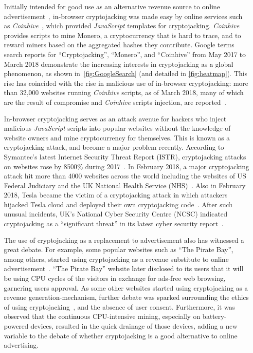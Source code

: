 \documentclass[acmlarge]{acmart}
\newcommand{\ch}{{\em Coinhive}\xspace}
\newcommand{\js}{{\em JavaScript}\xspace}
\newcommand{\cc}{{cryptocurrency}\xspace}
\newcommand{\cj}{cryptojacking\xspace}
\begin{document}
Initially intended for good use as an alternative revenue source to online advertisement~\cite{kerbs}, in-browser \cj was made easy by online services such as \ch~\cite{coinhive}, which provided \js templates for \cj. \ch provides scripts to mine Monero, a \cc that is hard to trace, and to reward miners based on the aggregated hashes they contribute.  Google terms search reports for ``Cryptojacking'', ``Monero'', and ``Coinhive'' from May 2017 to March 2018 demonstrate the increasing interests in \cj as a global phenomenon, as shown in~\autoref{fig:GoogleSearch} (and detailed in \autoref{fig:heatmap}). This rise has coincided with the rise in malicious use of in-browser \cj: more than 32,000 websites running \ch scripts, as of March 2018, many of which are the result of compromise and \ch scripts injection, are reported~\cite{kerbs}.






In-browser \cj serves as an attack avenue for hackers who inject malicious \js scripts into popular websites without the knowledge of website owners and mine \cc for themselves. This is known as a \cj attack, and become a major problem recently. According to Symantec's latest Internet Security Threat Report (ISTR), \cj attacks on websites rose by 8500\% during 2017~\cite{Mathur_18,Singh_18}. In February 2018, a major \cj attack hit more than 4000 websites across the world including the websites of US Federal Judiciary and the UK National Health Service (NHS)~\cite{condliffe_18}. Also in February 2018, Tesla became the victim of a \cj attack in which attackers hijacked Tesla cloud and deployed their own \cj code~\cite{Rayome_18}. After such unusual incidents, UK's National Cyber Security Centre (NCSC) indicated \cj as a ``significant threat'' in its latest cyber security report~\cite{de_18,ncsc_18}. 



The use of \cj as a replacement to advertisement also has witnessed a great debate. For example, some popular websites such as ``The Pirate Bay'', among others, started using \cj as a revenue substitute to online advertisement~\cite{Shaikh_17,Ernesto_17,Jones_2017}. ``The Pirate Bay'' website later disclosed to its users that it will be using CPU cycles of the visitors in exchange for ads-free web browsing, garnering users approval. As some other websites started using \cj as a revenue generation-mechanism, further debate was sparked surrounding the ethics of using \cj~\cite{Zuckerman_2018}, and the absence of user consent. Furthermore, it was observed that the continuous CPU-intensive mining, especially on battery-powered devices, resulted in the quick drainage of those devices, adding a new variable to the debate of whether \cj is a good alternative to online advertising. 
\end{document}
